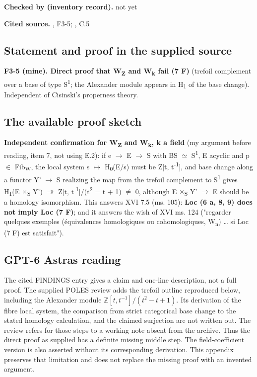 \noindent\textbf{Checked by (inventory record).} not yet\par\smallskip

\noindent\textbf{Cited source.} , F3-5; , C.5\par\medskip

\subsection*{Statement and proof in the supplied source}

\textbf{F3-5 (mine). Direct proof that W\textsubscript{Z} and W\textsubscript{k} fail (7 F)} (trefoil complement over a base of type S\textsuperscript{1};   the Alexander module appears in H\textsubscript{1} of the base change). Independent of Cisinski's properness theory.

\subsection*{The available proof sketch}
\textbf{Independent confirmation for W\textsubscript{Z} and W\textsubscript{k}, k a field} (my argument before reading,  item 7, not using E.2): if e \ensuremath{\to} E \ensuremath{\to} S with BS \ensuremath{\simeq} S\textsuperscript{1}, E acyclic and p \ensuremath{\in} Fib\textsubscript{W}, the local system s \ensuremath{\mapsto} H\textsubscript{0}(E/s) must be Z[t, t\textsuperscript{-1}], and base change along a functor Y' \ensuremath{\to} S realizing the map from the trefoil complement to S\textsuperscript{1} gives H\textsubscript{1}(E \ensuremath{\times}\textsubscript{S} Y') \ensuremath{\twoheadrightarrow} Z[t, t\textsuperscript{-1}]/(t\textsuperscript{2} \ensuremath{-} t + 1) \ensuremath{\ne} 0, although E \ensuremath{\times}\textsubscript{S} Y' \ensuremath{\to} E should be a homology isomorphism. This answers XVI 7.5 (ms. 105): \textbf{Loc (6 a, 8, 9) does not imply Loc (7 F)}; and it answers the wish of XVI ms. 124 ("regarder quelques exemples (équivalences homologiques ou cohomologiques, W\textsubscript{n}) \ldots{} si Loc (7 F) est satisfait").


\subsection*{GPT-6 Astra\textquotesingle s reading}

The cited FINDINGS entry gives a claim and one-line description, not a full proof. The supplied POLES review adds the trefoil outline reproduced below, including the Alexander module $\mathbb Z[t,t^{-1}]/(t^2-t+1)$. Its derivation of the fibre local system, the comparison from strict categorical base change to the stated homology calculation, and the claimed surjection are not written out. The review refers for those steps to a working note absent from the archive. Thus the direct proof as supplied has a definite missing middle step. The field-coefficient version is also asserted without its corresponding derivation. This appendix preserves that limitation and does not replace the missing proof with an invented argument.

